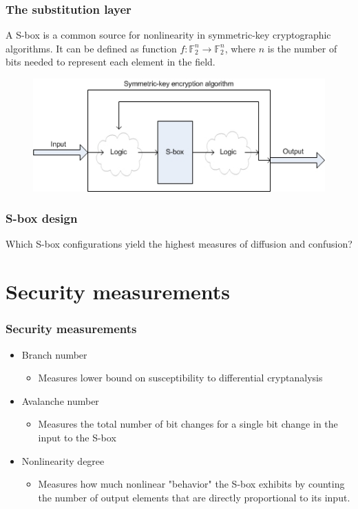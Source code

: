 \documentclass[handout]{beamer}
\newcommand{\field}[1]{\mathbb{#1}} %
\begin{document}

\begin{frame}
	\frametitle{The substitution layer}
	A S-box is a common source for nonlinearity in symmetric-key cryptographic algorithms. It can be defined as function $f : \field{F}_2^n \to \field{F}_2^n$, where $n$ is the number of bits needed to represent each element in the field.

\begin{figure}
\centering
\includegraphics[scale = 0.6]{images/sub_layer.jpg}
\end{figure}
\end{frame}

\begin{frame}
	\frametitle{S-box design}
	Which S-box configurations yield the highest measures of diffusion and confusion?
\end{frame}

\section{Security measurements}
\begin{frame}
	\frametitle{Security measurements}
	\begin{itemize}
		\item Branch number 
		\begin{itemize}
			\item Measures lower bound on susceptibility to differential cryptanalysis
		\end{itemize}
		\item Avalanche number
		\begin{itemize}
			\item Measures the total number of bit changes for a single bit change in the input to the S-box
		\end{itemize}
		\item Nonlinearity degree 
		\begin{itemize}
			\item Measures how much nonlinear "behavior" the S-box exhibits by counting the number of output elements that are directly proportional to its input.
		\end{itemize}
	\end{itemize}
\end{frame}
\end{document}
